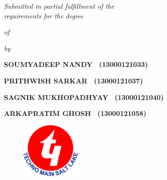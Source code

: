 \begin{titlepage}
    \thispagestyle{empty}
    \begin{center}
    \vspace*{\fill} %
    
        {\Large \bfseries 
        \begin{spacing}{1}
            \mytitle
        \end{spacing}
        \par}
        
        \vspace{2.5\baselineskip}
        
        {\large \textit{Submitted in partial fulfillment of the}}\\
        {\large \textit{requirements for the degree}} \par
        
        \vspace{\baselineskip}
        
        {\large \textit{of}} \par
        
        \vspace{\baselineskip}
        
        {\Large \bf \mydegree \par} 
        
        \vspace{\baselineskip}
        
        {\large \textit{by}} \par
        
        \vspace{\baselineskip}
        
        {\Large \bf SOUMYADEEP NANDY ~(13000121033)} \par
        {\Large \bf PRITHWISH SARKAR ~(13000121037)} \par
        {\Large \bf SAGNIK MUKHOPADHYAY ~(13000121040)} \par
        {\Large \bf ARKAPRATIM GHOSH ~(13000121058)} \par
        
        \vspace{2\baselineskip}
        
        \begin{figure}[!h]
            \centering
            \includegraphics[width=30mm]{./Images/tmsl.png}
        \end{figure}
        

\end{center}
\end{titlepage}
